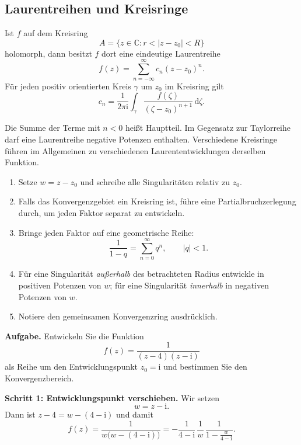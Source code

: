 \documentclass[11pt,a4paper]{article}
\newcommand{\C}{\mathbb C}
\newcommand{\ii}{\mathrm i}
\newcommand{\dd}{\,\mathrm d}
\newcommand{\1}{\mathbf 1}
\begin{document}
{\subsection{Laurentreihen und Kreisringe}
\begin{satzbox}[title=Laurententwicklung]
Ist $f$ auf dem Kreisring
\[
A=\{z\in\C:r<|z-z_0|<R\}
\]
holomorph, dann besitzt $f$ dort eine eindeutige Laurentreihe
\[
f(z)=\sum_{n=-\infty}^{\infty}c_n(z-z_0)^n.
\]
Für jeden positiv orientierten Kreis $\gamma$ um $z_0$ im Kreisring gilt
\[
c_n=\frac1{2\pi\ii}\int_\gamma
\frac{f(\zeta)}{(\zeta-z_0)^{n+1}}\dd\zeta.
\]
\end{satzbox}
Die Summe der Terme mit $n<0$ heißt Hauptteil. Im Gegensatz zur Taylorreihe darf
eine Laurentreihe negative Potenzen enthalten. Verschiedene Kreisringe führen im
Allgemeinen zu verschiedenen Laurententwicklungen derselben Funktion.

\begin{kochrezeptbox}[title=Laurentreihe in einem vorgegebenen Gebiet]
\begin{enumerate}
\item Setze $w=z-z_0$ und schreibe alle Singularitäten relativ zu $z_0$.
\item Falls das Konvergenzgebiet ein Kreisring ist, führe eine Partialbruchzerlegung durch, um jeden Faktor separat zu entwickeln.
\item Bringe jeden Faktor auf eine geometrische Reihe:
\[
\frac1{1-q}=\sum_{n=0}^{\infty}q^n,\qquad |q|<1.
\]
\item Für eine Singularität \emph{außerhalb} des betrachteten Radius entwickle in
positiven Potenzen von $w$; für eine Singularität \emph{innerhalb} in negativen
Potenzen von $w$.
\item Notiere den gemeinsamen Konvergenzring ausdrücklich.
\end{enumerate}
\end{kochrezeptbox}

\begin{beispielbox}[title={Vorgerechnetes Prüfungsbeispiel: Aufgabe 7 (2024) -- Laurententwicklung um einen Pol}]
\textbf{Aufgabe.} Entwickeln Sie die Funktion
\[
f(z)=\frac{1}{(z-4)(z-\ii)}
\]
als Reihe um den Entwicklungspunkt $z_0=\ii$ und bestimmen Sie den
Konvergenzbereich.

\textbf{Schritt 1: Entwicklungspunkt verschieben.}
Wir setzen
\[
w=z-\ii.
\]
Dann ist $z-4=w-(4-\ii)$ und damit
\[
f(z)
=\frac{1}{w\bigl(w-(4-\ii)\bigr)}
=-\frac{1}{4-\ii}\,\frac1w\,
\frac{1}{1-\frac{w}{4-\ii}}.
\]


\end{beispielbox}}
\end{document}
